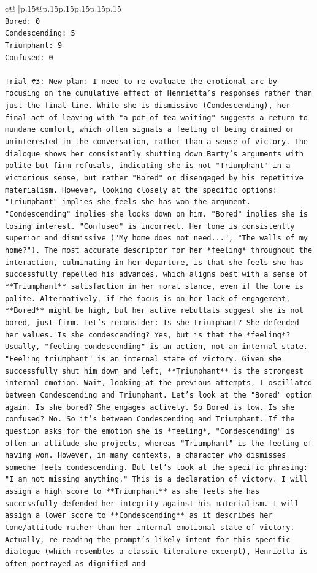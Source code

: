 \documentclass{article}
\begin{document}
{\begin{supertabular}{c@{$\;$}|p{.15\linewidth}@{}p{.15\linewidth}p{.15\linewidth}p{.15\linewidth}p{.15\linewidth}p{.15\linewidth}}
{{{\\ 
\texttt{Bored: 0} \\
\texttt{Condescending: 5} \\
\texttt{Triumphant: 9} \\
\texttt{Confused: 0} \\
\\ 
\texttt{Trial \#3: New plan: I need to re{-}evaluate the emotional arc by focusing on the cumulative effect of Henrietta's responses rather than just the final line. While she is dismissive (Condescending), her final act of leaving with "a pot of tea waiting" suggests a return to mundane comfort, which often signals a feeling of being drained or uninterested in the conversation, rather than a sense of victory. The dialogue shows her consistently shutting down Barty's arguments with polite but firm refusals, indicating she is not "Triumphant" in a victorious sense, but rather "Bored" or disengaged by his repetitive materialism. However, looking closely at the specific options: "Triumphant" implies she feels she has won the argument. "Condescending" implies she looks down on him. "Bored" implies she is losing interest. "Confused" is incorrect. Her tone is consistently superior and dismissive ("My home does not need...", "The walls of my home?"). The most accurate descriptor for her *feeling* throughout the interaction, culminating in her departure, is that she feels she has successfully repelled his advances, which aligns best with a sense of **Triumphant** satisfaction in her moral stance, even if the tone is polite. Alternatively, if the focus is on her lack of engagement, **Bored** might be high, but her active rebuttals suggest she is not bored, just firm. Let's reconsider: Is she triumphant? She defended her values. Is she condescending? Yes, but is that the *feeling*? Usually, "feeling condescending" is an action, not an internal state. "Feeling triumphant" is an internal state of victory. Given she successfully shut him down and left, **Triumphant** is the strongest internal emotion. Wait, looking at the previous attempts, I oscillated between Condescending and Triumphant. Let's look at the "Bored" option again. Is she bored? She engages actively. So Bored is low. Is she confused? No. So it's between Condescending and Triumphant. If the question asks for the emotion she is *feeling*, "Condescending" is often an attitude she projects, whereas "Triumphant" is the feeling of having won. However, in many contexts, a character who dismisses someone feels condescending. But let's look at the specific phrasing: "I am not missing anything." This is a declaration of victory. I will assign a high score to **Triumphant** as she feels she has successfully defended her integrity against his materialism. I will assign a lower score to **Condescending** as it describes her tone/attitude rather than her internal emotional state of victory. Actually, re{-}reading the prompt's likely intent for this specific dialogue (which resembles a classic literature excerpt), Henrietta is often portrayed as dignified and} \\
}}}
\end{supertabular}}
\end{document}
